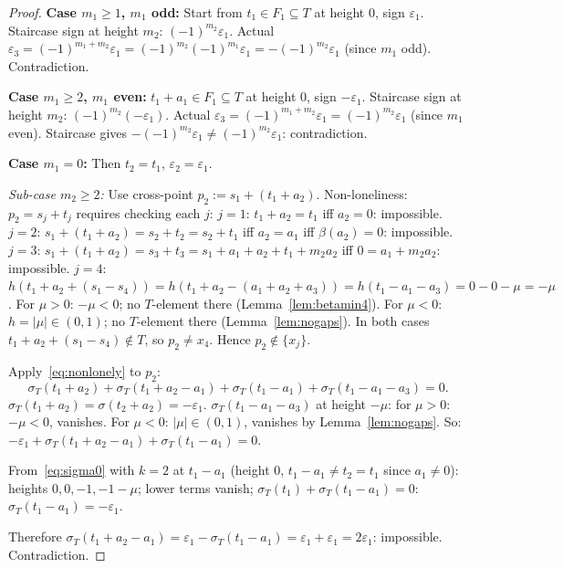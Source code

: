 \documentclass{article}
\begin{document}
\begin{proof}
\textbf{Case $m_1\ge 1$, $m_1$ odd:}
Start from $t_1\in F_1\subseteq T$ at height $0$, sign $\varepsilon_1$.
Staircase sign at height $m_2$: $(-1)^{m_2}\varepsilon_1$.
Actual $\varepsilon_3=(-1)^{m_1+m_2}\varepsilon_1=(-1)^{m_2}(-1)^{m_1}\varepsilon_1=-(-1)^{m_2}\varepsilon_1$ (since $m_1$ odd).
Contradiction.

\textbf{Case $m_1\ge 2$, $m_1$ even:}
$t_1+a_1\in F_1\subseteq T$ at height $0$, sign $-\varepsilon_1$.
Staircase sign at height $m_2$: $(-1)^{m_2}(-\varepsilon_1)$.
Actual $\varepsilon_3=(-1)^{m_1+m_2}\varepsilon_1=(-1)^{m_2}\varepsilon_1$ (since $m_1$ even).
Staircase gives $-(-1)^{m_2}\varepsilon_1\ne(-1)^{m_2}\varepsilon_1$: contradiction.

\textbf{Case $m_1=0$:}
Then $t_2=t_1$, $\varepsilon_2=\varepsilon_1$.

\textit{Sub-case $m_2\ge 2$:}
Use cross-point $p_2:=s_1+(t_1+a_2)$.
Non-loneliness: $p_2=s_j+t_j$ requires checking each $j$:
$j=1$: $t_1+a_2=t_1$ iff $a_2=0$: impossible.
$j=2$: $s_1+(t_1+a_2)=s_2+t_2=s_2+t_1$ iff $a_2=a_1$ iff $\beta(a_2)=0$: impossible.
$j=3$: $s_1+(t_1+a_2)=s_3+t_3=s_1+a_1+a_2+t_1+m_2a_2$ iff $0=a_1+m_2a_2$: impossible.
$j=4$: $h(t_1+a_2+(s_1-s_4))=h(t_1+a_2-(a_1+a_2+a_3))=h(t_1-a_1-a_3)=0-0-\mu=-\mu$.
For $\mu>0$: $-\mu<0$; no $T$-element there (Lemma~\ref{lem:betamin4}).
For $\mu<0$: $h=|\mu|\in(0,1)$; no $T$-element there (Lemma~\ref{lem:nogaps}).
In both cases $t_1+a_2+(s_1-s_4)\notin T$, so $p_2\ne x_4$.
Hence $p_2\notin\{x_j\}$.

Apply~\eqref{eq:nonlonely} to $p_2$:
\[
  \sigma_T(t_1+a_2)+\sigma_T(t_1+a_2-a_1)+\sigma_T(t_1-a_1)+\sigma_T(t_1-a_1-a_3)=0.
\]
$\sigma_T(t_1+a_2)=\sigma(t_2+a_2)=-\varepsilon_1$.
$\sigma_T(t_1-a_1-a_3)$ at height $-\mu$:
for $\mu>0$: $-\mu<0$, vanishes.
For $\mu<0$: $|\mu|\in(0,1)$, vanishes by Lemma~\ref{lem:nogaps}.
So: $-\varepsilon_1+\sigma_T(t_1+a_2-a_1)+\sigma_T(t_1-a_1)=0$.

From~\eqref{eq:sigma0} with $k=2$ at $t_1-a_1$ (height $0$, $t_1-a_1\ne t_2=t_1$ since $a_1\ne 0$):
heights $0,0,-1,-1-\mu$; lower terms vanish; $\sigma_T(t_1)+\sigma_T(t_1-a_1)=0$:
$\sigma_T(t_1-a_1)=-\varepsilon_1$.

Therefore $\sigma_T(t_1+a_2-a_1)=\varepsilon_1-\sigma_T(t_1-a_1)=\varepsilon_1+\varepsilon_1=2\varepsilon_1$:
impossible. Contradiction.


\end{proof}
\end{document}
